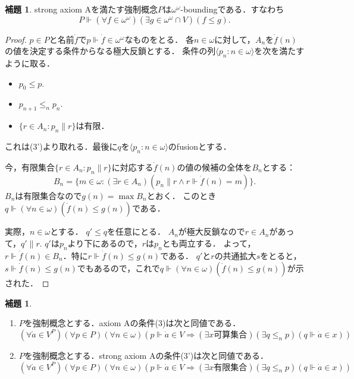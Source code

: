 \documentclass[uplatex]{jsarticle}
\newcommand\forces{\Vdash}
\newcommand{\seq}[1]{{\langle#1\rangle}}
\theoremstyle{definition}
\newtheorem{lem}[thm]{補題}
\begin{document}
	\begin{lem}
		strong axiom Aを満たす強制概念$P$は$\omega^\omega$-boundingである．すなわち
		\[
		P \forces (\forall f \in \omega^\omega)(\exists g \in \omega^\omega \cap V)(f \le g).
		\]
	\end{lem}
	\begin{proof}
		$p \in P$と名前$\dot{f}$で$p \forces \dot{f} \in \omega^\omega$なものをとる．
		各$n \in \omega$に対して，$A_n$を$\dot{f}(n)$の値を決定する条件からなる極大反鎖とする．
		条件の列$\seq{p_n : n \in \omega}$を次を満たすように取る．
		\begin{itemize}
			\item $p_0 \le p$.
			\item $p_{n+1} \le_n p_n$.
			\item $\{ r \in A_n : p_n \parallel r \}$は有限．
		\end{itemize}
		これは(3')より取れる．最後に$q$を$\seq{p_n : n \in \omega}$のfusionとする．
		
		今，有限集合$\{ r \in A_n : p_n \parallel r \}$に対応する$\dot{f}(n)$の値の候補の全体を$B_n$とする：
		\[
		B_n = \{ m \in \omega : (\exists r \in A_n) (p_n \parallel r \land r \forces \dot{f}(n) = m) \}.
		\]
		$B_n$は有限集合なので$g(n) = \max B_n$とおく．
		このとき$q \forces (\forall n \in \omega)(\dot{f}(n) \le g(n))$である．
		
		実際，$n \in \omega$とする．
		$q' \le q$を任意にとる．
		$A_n$が極大反鎖なので$r \in A_n$があって，$q' \parallel r$.
		$q'$は$p_n$より下にあるので，$r$は$p_n$とも両立する．
		よって，$r \forces \dot{f}(n) \in B_n$．特に$r \forces \dot{f}(n) \le g(n)$である．
		$q'$と$r$の共通拡大$s$をとると，$s \forces \dot{f}(n) \le g(n)$でもあるので，これで$q \forces (\forall n \in \omega)(\dot{f}(n) \le g(n))$が示された．
	\end{proof}

	\begin{lem}
		\begin{enumerate}
		\item $P$を強制概念とする．axiom Aの条件(3)は次と同値である．
		\[
		(\forall \dot{a} \in V^P)(\forall p \in P)(\forall n \in \omega)(p \forces \dot{a} \in V \Rightarrow (\exists x \text{可算集合})(\exists q \le_n p)(q \forces \dot{a} \in x))
		\]
		\item $P$を強制概念とする．strong axiom Aの条件(3')は次と同値である．
		\[
		(\forall \dot{a} \in V^P)(\forall p \in P)(\forall n \in \omega)(p \forces \dot{a} \in V \Rightarrow (\exists x \text{有限集合})(\exists q \le_n p)(q \forces \dot{a} \in x))
		\]
		\end{enumerate}
	\end{lem}
\end{document}
